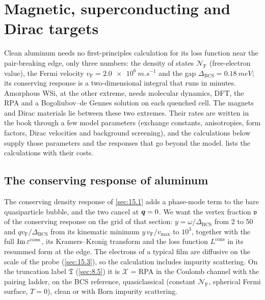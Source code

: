 \section{Magnetic, superconducting and Dirac targets}\label{app:E.20}

Clean aluminum needs no first-principles calculation for its loss function near the pair-breaking edge, only three numbers: the density of states $\mathcal{N}_{\mathrm{F}}$ (free-electron value), the Fermi velocity $v_{\mathrm{F}} = \SI{2.0e6}{m.s^{-1}}$ and the gap $\Delta_{\mathrm{BCS}} = \SI{0.18}{meV}$; its conserving response is a two-dimensional integral that runs in minutes. Amorphous WSi, at the other extreme, needs molecular dynamics, DFT, the RPA and a Bogoliubov--de Gennes solution on each quenched cell. The magnets and Dirac materials lie between these two extremes. Their rates are written in the book through a few model parameters (exchange constants, anisotropies, form factors, Dirac velocities and background screening), and the calculations below supply those parameters and the responses that go beyond the model.  lists the calculations with their costs.

\subsection{The conserving response of aluminum}

The conserving density response of \cref{sec:15.1} adds a phase-mode term to the bare quasiparticle bubble, and the two cancel at $\bm{q} = 0$. We want the vertex fraction $\mathfrak{v}$ of the conserving response on the grid of that section: $y = \omega/\Delta_{\mathrm{BCS}}$ from 2 to 50 and $qv_{\mathrm{F}}/\Delta_{\mathrm{BCS}}$ from its kinematic minimum $y\,v_{\mathrm{F}}/v_{\mathrm{max}}$ to $10^3$, together with the full $\operatorname{Im}\varepsilon^{\mathrm{cons}}$, its Kramers--Kronig transform and the loss function $L^{\mathrm{cons}}$ in its resummed form at the edge. The electrons of a typical film are diffusive on the scale of the probe (\cref{sec:15.3}), so the calculation includes impurity scattering. On the truncation label $\mathfrak{T}$ (\cref{sec:8.5}) it is $\mathcal{X}$ = RPA in the Coulomb channel with the pairing ladder, on the BCS reference, quasiclassical (constant $\mathcal{N}_{\mathrm{F}}$, spherical Fermi surface, $T = 0$), clean or with Born impurity scattering.


